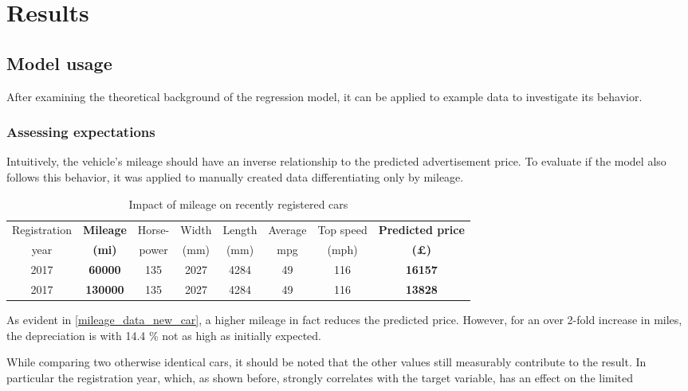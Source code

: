 \chapter{Results}
\section{Model usage}\label{model_usage_section}
After examining the theoretical background of the regression model, it can be applied to example data to investigate its behavior.
\subsection{Assessing expectations}
Intuitively, the vehicle's mileage should have an inverse relationship to the predicted advertisement price.
To evaluate if the model also follows this behavior, it was applied to manually created data differentiating only by mileage.
\begin{table}[H]
    \begin{adjustbox}{width={\textwidth}}
        \begin{tabular}{|c|c|c|c|c|c|c|c|}
            \hline
            Registration & \textbf{Mileage} & Horse- & Width & Length & Average & Top speed & \textbf{Predicted price} \\[-1ex]
            year         & \textbf{(mi)}    & power  & (mm)  & (mm)   & mpg     & (mph)     & \textbf{(£)}             \\ \hline
            2017         & \textbf{60000}   & 135    & 2027  & 4284   & 49      & 116       & \textbf{16157}           \\\hline
            2017         & \textbf{130000}  & 135    & 2027  & 4284   & 49      & 116       & \textbf{13828}           \\\hline
        \end{tabular}
    \end{adjustbox}
    \caption{Impact of mileage on recently registered cars}
    \label{mileage_data_new_car}
\end{table}
As evident in \autoref{mileage_data_new_car}, a higher mileage in fact reduces the predicted price.
However, for an over 2-fold increase in miles, the depreciation is with 14.4 \% not as high as initially expected.
\par
While comparing two otherwise identical cars, it should be noted that the other values still measurably contribute to the
result.
\newline
In particular the registration year, which, as shown before, strongly correlates with the target variable, has an effect on the limited
